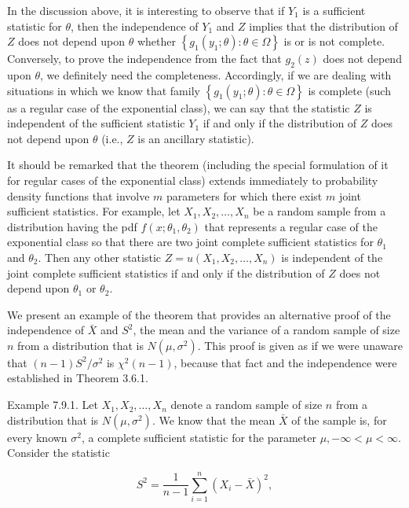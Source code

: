 In the discussion above, it is interesting to observe that if $Y_{1}$ is a sufficient statistic for $\theta$, then the independence of $Y_{1}$ and $Z$ implies that the distribution of $Z$ does not depend upon $\theta$ whether $\left\{g_{1}\left(y_{1} ; \theta\right): \theta \in \Omega\right\}$ is or is not complete. Conversely, to prove the independence from the fact that $g_{2}(z)$ does not depend upon $\theta$, we definitely need the completeness. Accordingly, if we are dealing with situations in which we know that family $\left\{g_{1}\left(y_{1} ; \theta\right): \theta \in \Omega\right\}$ is complete (such as a regular case of the exponential class), we can say that the statistic $Z$ is independent of the sufficient statistic $Y_{1}$ if and only if the distribution of $Z$ does not depend upon $\theta$ (i.e., $Z$ is an ancillary statistic).

It should be remarked that the theorem (including the special formulation of it for regular cases of the exponential class) extends immediately to probability density functions that involve $m$ parameters for which there exist $m$ joint sufficient statistics. For example, let $X_{1}, X_{2}, \ldots, X_{n}$ be a random sample from a distribution having the pdf $f\left(x ; \theta_{1}, \theta_{2}\right)$ that represents a regular case of the exponential class so that there are two joint complete sufficient statistics for $\theta_{1}$ and $\theta_{2}$. Then any other statistic $Z=u\left(X_{1}, X_{2}, \ldots, X_{n}\right)$ is independent of the joint complete sufficient statistics if and only if the distribution of $Z$ does not depend upon $\theta_{1}$ or $\theta_{2}$.

We present an example of the theorem that provides an alternative proof of the independence of $\bar{X}$ and $S^{2}$, the mean and the variance of a random sample of size $n$ from a distribution that is $N\left(\mu, \sigma^{2}\right)$. This proof is given as if we were unaware that $(n-1) S^{2} / \sigma^{2}$ is $\chi^{2}(n-1)$, because that fact and the independence were established in Theorem 3.6.1.

Example 7.9.1. Let $X_{1}, X_{2}, \ldots, X_{n}$ denote a random sample of size $n$ from a distribution that is $N\left(\mu, \sigma^{2}\right)$. We know that the mean $\bar{X}$ of the sample is, for every known $\sigma^{2}$, a complete sufficient statistic for the parameter $\mu,-\infty<\mu<\infty$. Consider the statistic

$$
S^{2}=\frac{1}{n-1} \sum_{i=1}^{n}\left(X_{i}-\bar{X}\right)^{2},
$$

